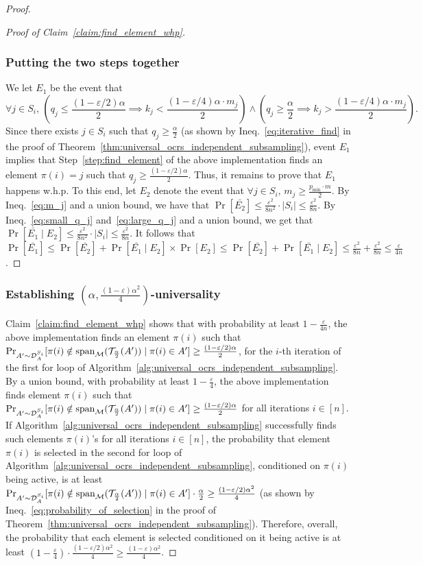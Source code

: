 \documentclass[11pt]{article}
\newcommand{\D}{\mathcal D}
\newcommand{\M}{{\mathcal M}}
\newcommand{\T}{{\mathcal T}}
\newcommand{\eps}{\varepsilon}
\newcommand{\spa}{\textnormal{span}}
\begin{document}
\begin{proof}
\begin{proof}[Proof of Claim~\ref{claim:find_element_whp}]
\subsubsection*{Putting the two steps together}
We let $E_1$ be the event that
\[
    \forall j\in S_i,\,\left(q_j\le\frac{(1-\eps/2)\alpha}{2}\implies k_j<\frac{(1-\eps/4)\alpha\cdot m_j}{2}\right)\wedge\left(q_j\ge\frac{\alpha}{2}\implies k_j>\frac{(1-\eps/4)\alpha\cdot m_j}{2}\right).
\]
Since there exists $j\in S_i$ such that $q_j\ge\frac{\alpha}{2}$ (as shown by Ineq.~\eqref{eq:iterative_find} in the proof of Theorem~\ref{thm:universal_ocrs_independent_subsampling}), event $E_1$ implies that Step~\ref{step:find_element} of the above implementation finds an element $\pi(i)=j$ such that $q_j\ge\frac{(1-\eps/2)\alpha}{2}$. Thus, it remains to prove that $E_1$ happens w.h.p. To this end, let $E_2$ denote the event that $\forall j\in S_i,\,m_j\ge\frac{p_{\min}\cdot m}{2}$. By Ineq.~\eqref{eq:m_j} and a union bound, we have that $\Pr[\bar{E_2}]\le\frac{\eps^2}{8n^2}\cdot|S_i|\le\frac{\eps^2}{8n}$.
By Ineq.~\eqref{eq:small_q_j} and~\eqref{eq:large_q_j} and a union bound, we get that
$\Pr[\bar{E_1}\mid E_2]\le\frac{\eps^2}{8n^2}\cdot |S_i|\le\frac{\eps^2}{8n}$. It follows that
$\Pr[\bar{E_1}]\le \Pr[\bar{E_2}]+\Pr[\bar{E_1}\mid E_2]\times \Pr[E_2] \le \Pr[\bar{E_2}]+\Pr[\bar{E_1}\mid E_2] \le \frac{\eps^2}{8n}+\frac{\eps^2}{8n}\le\frac{\eps}{4n}$.
\end{proof}

\subsubsection*{Establishing $(\alpha,\frac{(1-\eps)\alpha^2}{4})$-universality}
Claim~\ref{claim:find_element_whp} shows that with probability at least $1-\frac{\eps}{4n}$, the above implementation finds an element $\pi(i)$ such that ${\Pr}_{A'\sim \D_A^{S_i}}[\pi(i)\notin \spa_{\M}(\T_{\frac{\alpha}{2}}(A'))\mid \pi(i)\in A']\ge\frac{(1-\eps/2)\alpha}{2}$, for the $i$-th iteration of the first for loop of Algorithm~\ref{alg:universal_ocrs_independent_subsampling}.
By a union bound, with probability at least $1-\frac{\eps}{4}$, the above implementation finds element $\pi(i)$ such that ${\Pr}_{A'\sim \D_A^{S_i}}[\pi(i)\notin \spa_{\M}(\T_{\frac{\alpha}{2}}(A'))\mid \pi(i)\in A']\ge\frac{(1-\eps/2)\alpha}{2}$ for all iterations $i\in[n]$. If Algorithm~\ref{alg:universal_ocrs_independent_subsampling} successfully finds such elements $\pi(i)$'s for all iterations $i\in[n]$, the probability that element $\pi(i)$ is selected in the second for loop of Algorithm~\ref{alg:universal_ocrs_independent_subsampling}, conditioned on $\pi(i)$ being active, is at least ${\Pr}_{A'\sim \D_A^{S_i}}[\pi(i)\notin \spa_{\M}(\T_{\frac{\alpha}{2}}(A'))\mid \pi(i)\in A']\cdot \frac{\alpha}{2}\ge \frac{(1-\eps/2)\alpha^2}{4}$ (as shown by Ineq.~\eqref{eq:probability_of_selection} in the proof of Theorem~\ref{thm:universal_ocrs_independent_subsampling}). Therefore, overall, the probability that each element is selected conditioned on it being active is at least $(1-\frac{\eps}{4})\cdot\frac{(1-\eps/2)\alpha^2}{4}\ge\frac{(1-\eps)\alpha^2}{4}$.


\end{proof}
\end{document}
